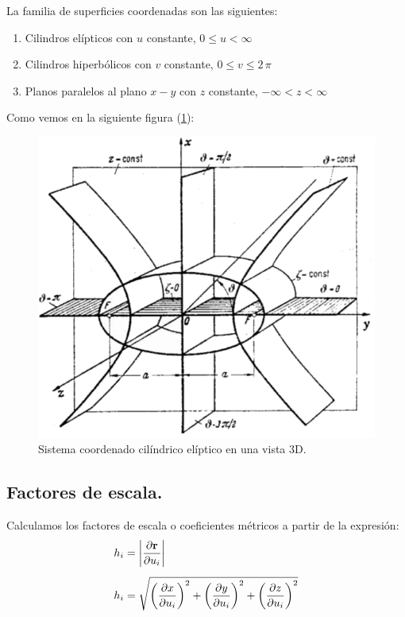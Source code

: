 \documentclass[12pt]{article}
\numberwithin{equation}{section}
\begin{document}
La familia de superficies coordenadas son las siguientes:
\begin{enumerate}
\item Cilindros elípticos con $u$ constante, $0 \leq u < \infty$
\item Cilindros hiperbólicos con $v$ constante, $0 \leq v \leq 2 \, \pi$
\item Planos paralelos al plano $x-y$ con $z$ constante, $-\infty < z < \infty$
\end{enumerate}
Como vemos en la siguiente figura (\ref{fig:figura_coordenada_cilindricas_elipticas_3D}):

\begin{figure}[H]
    \centering
    \includegraphics[scale=0.6]{Imagenes/Elliptic-cylindrical-coordinates_02.png}
    \caption{Sistema coordenado cilíndrico elíptico en una vista 3D.}
    \label{fig:figura_coordenada_cilindricas_elipticas_3D}
\end{figure}

\subsection{Factores de escala.}

Calculamos los factores de escala o coeficientes métricos a partir de la expresión:
\begin{align*}
h_{i} &= \abs{\pdv{\vb{r}}{u_{i}}} \\[0.5em]
h_{i} &= \sqrt{ \left( \pdv{x}{u_{i}} \right)^{2} + \left( \pdv{y}{u_{i}} \right)^{2} + \left( \pdv{z}{u_{i}} \right)^{2}}
\end{align*}
\end{document}
